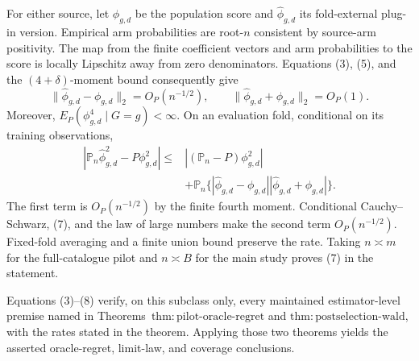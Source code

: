 For either source, let \(\phi_{g,d}\) be the population score and \(\widehat\phi_{g,d}\) its fold-external plug-in version.  Empirical arm probabilities are root-\(n\) consistent by source-arm positivity.  The map from the finite coefficient vectors and arm probabilities to the score is locally Lipschitz away from zero denominators.  Equations (3), (5), and the \((4+\delta)\)-moment bound consequently give
\[
 \|\widehat\phi_{g,d}-\phi_{g,d}\|_2=O_P(n^{-1/2}),
 \qquad
 \|\widehat\phi_{g,d}+\phi_{g,d}\|_2=O_P(1).                \tag{7}
\]
Moreover, \(E_P(\phi_{g,d}^4\mid G=g)<\infty\).  On an evaluation fold, conditional on its training observations,
\[
\begin{aligned}
 |\mathbb P_n\widehat\phi_{g,d}^2-P\phi_{g,d}^2|
 \le{}&| (\mathbb P_n-P)\phi_{g,d}^2|\\
 &+\mathbb P_n\{|\widehat\phi_{g,d}-\phi_{g,d}|
 |\widehat\phi_{g,d}+\phi_{g,d}|\}.
                                                                    \tag{8}
\end{aligned}
\]
The first term is \(O_P(n^{-1/2})\) by the finite fourth moment.  Conditional Cauchy--Schwarz, (7), and the law of large numbers make the second term \(O_P(n^{-1/2})\).  Fixed-fold averaging and a finite union bound preserve the rate.  Taking \(n\asymp m\) for the full-catalogue pilot and \(n\asymp B\) for the main study proves (7) in the statement.

Equations (3)--(8) verify, on this subclass only, every maintained estimator-level premise named in Theorems~\(\mathrm{thm{:}pilot\text{-}oracle\text{-}regret}\) and \(\mathrm{thm{:}postselection\text{-}wald}\), with the rates stated in the theorem.  Applying those two theorems yields the asserted oracle-regret, limit-law, and coverage conclusions.